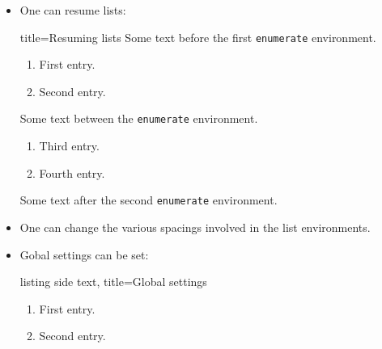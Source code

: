 \begin{itemize}
  \item
    One can resume lists:
    \begin{tcblisting}{title={Resuming lists}}
Some text before the first \texttt{enumerate} environment.
\begin{enumerate}
  \item
    First entry.
  \item
    Second entry.
\end{enumerate}
Some text between the \texttt{enumerate} environment.
\begin{enumerate}[resume]
  \item
    Third entry.
  \item
    Fourth entry.
\end{enumerate}
Some text after the second \texttt{enumerate} environment.
    \end{tcblisting}
    
  \item
    One can change the various spacings involved in the list environments.

  \item
    Gobal settings can be set:
    \begin{tcblisting}{listing side text, title={Global settings}}
\begin{enumerate}
  \item
    First entry.
  \item
    Second entry.
\end{enumerate}
    \end{tcblisting}
    

\end{itemize}
